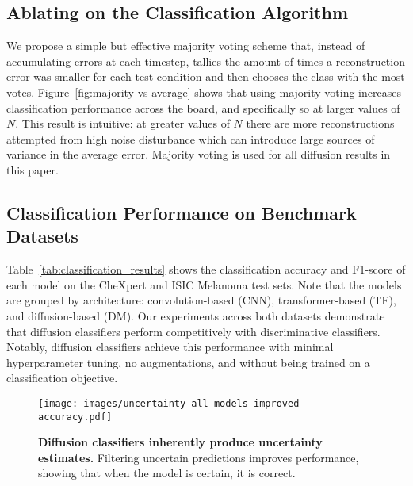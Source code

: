 \subsection{Ablating on the Classification Algorithm}
\begin{comment}
Many ablations on the diffusion classification algorithm are explored in natural images~\cite{Li:arXiv:2023:diffusionClassifier} including but not limited to: sampling steps ($N$), step range $(t_{min},t_{max})$, and step distribution (strided, normal/uniform random). In medical imaging, we too find that classification performance improves with more sampling steps, a maximal timestep range, $t \in (0,1)$, and uniformly sampling $t$ in its range. 
\end{comment}

We propose a simple but effective majority voting scheme that, instead of accumulating errors at each timestep, tallies the amount of times a reconstruction error was smaller for each test condition and then chooses the class with the most votes. Figure~\ref{fig:majority-vs-average} shows that using majority voting increases classification performance across the board, and specifically so at larger values of $N$. This result is intuitive: at greater values of $N$ there are more reconstructions attempted from high noise disturbance which can introduce large sources of variance in the average error. Majority voting is used for all diffusion results in this paper.

\subsection{Classification Performance on Benchmark Datasets}

Table~\ref{tab:classification_results} shows the classification accuracy and F1-score of each model on the CheXpert and ISIC Melanoma test sets. Note that the models are grouped by architecture: convolution-based (CNN), transformer-based (TF), and diffusion-based (DM). Our experiments across both datasets demonstrate that diffusion classifiers perform competitively with discriminative classifiers. Notably, diffusion classifiers achieve this performance with minimal hyperparameter tuning, no augmentations, and without being trained on a classification objective.

\begin{wrapfigure}{r}{0.5\textwidth}
    \centering
    \vspace{-30pt}
    \texttt{[image: images/uncertainty-all-models-improved-accuracy.pdf]}
    \caption{\textbf{Diffusion classifiers inherently produce uncertainty estimates.} Filtering uncertain predictions improves performance, showing that when the model is certain, it is correct.} %
    \label{fig:uncertainty}
\end{wrapfigure}

